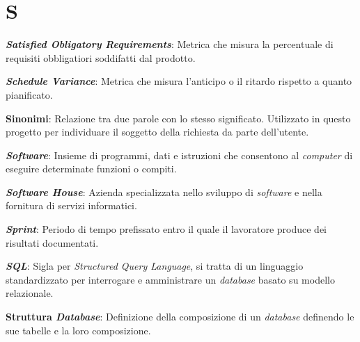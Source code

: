 \documentclass[5pt]{article}
\begin{document}
\section*{S}
\begin{flushleft}
	
\textbf{\textit{Satisfied Obligatory Requirements}}: Metrica che misura la percentuale di requisiti obbligatiori soddifatti dal prodotto.\newline

\textbf{\textit{Schedule Variance}}: Metrica che misura l'anticipo o il ritardo rispetto a quanto pianificato.\newline

\textbf{Sinonimi}: Relazione tra due parole con lo stesso significato. Utilizzato in questo progetto per individuare il soggetto della richiesta da parte dell'utente.\newline

\textbf{\textit{Software}}: Insieme di programmi, dati e istruzioni che consentono al \textit{computer} di eseguire determinate funzioni o compiti.\newline

\textbf{\textit{Software House}}: Azienda specializzata nello sviluppo di \textit{software} e nella fornitura di servizi informatici.\newline


\textbf{\textit{Sprint}}: Periodo di tempo prefissato entro il quale il lavoratore produce dei risultati documentati.\newline

\textbf{\textit{SQL}}: Sigla per \textit{Structured Query Language}, si tratta di un linguaggio standardizzato per interrogare e amministrare un \textit{database} basato su modello relazionale.\newline

\textbf{Struttura \textit{Database}}: Definizione della composizione di un \textit{database} definendo le sue tabelle e la loro composizione.\newline

\end{flushleft}
\end{document}
